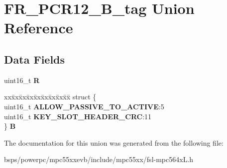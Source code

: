 \hypertarget{unionFR__PCR12__16B__tag}{}\section{F\+R\+\_\+\+P\+C\+R12\+\_\+B\+\_\+tag Union Reference}
\label{unionFR__PCR12__16B__tag}
\subsection*{Data Fields}
\begin{DoxyCompactItemize}
\item 
\mbox{\label{unionFR__PCR12__16B__tag_a569e995ad89478f042a637c32547bfec}} 
uint16\+\_\+t {\bfseries R}
\item 
\mbox{\label{unionFR__PCR12__16B__tag_ac6c31b5af59849699c25f0149254bcdc}} 
\begin{tabbing}
xx\=xx\=xx\=xx\=xx\=xx\=xx\=xx\=xx\=\kill
struct \{\\
\>uint16\_t {\bfseries ALLOW\_PASSIVE\_TO\_ACTIVE}:5\\
\>uint16\_t {\bfseries KEY\_SLOT\_HEADER\_CRC}:11\\
\} {\bfseries B}\\

\end{tabbing}\end{DoxyCompactItemize}


The documentation for this union was generated from the following file\+:\begin{DoxyCompactItemize}
\item 
bsps/powerpc/mpc55xxevb/include/mpc55xx/fsl-\/mpc564x\+L.\+h\end{DoxyCompactItemize}
